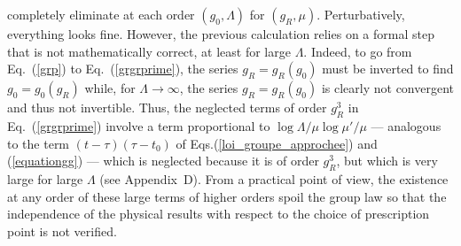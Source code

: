 \documentclass[floatfix,twocolumn,preprintnumbers,amsmath,amssymb,prb]{revtex4}
\begin{document}
completely eliminate at each order $(g_0,\Lambda)$ for $(g_R,\mu)$.
Perturbatively, everything looks fine. However, the previous
calculation relies on a formal step that is not mathematically
correct, at least for large $\Lambda$. Indeed, to go from
Eq.~(\ref{grp}) to Eq.~(\ref{grgrprime}), the series
$g_R=g_R(g_0)$ must be inverted to find $g_0=g_0(g_R)$ while, for
$\Lambda\to\infty$, the series $g_R=g_R(g_0)$ is clearly not 
convergent and thus not invertible. Thus, the neglected terms of
order $g_R^3$ in Eq.~(\ref{grgrprime}) involve a term proportional
to $\log\Lambda/\mu \log\mu'/\mu$ --- analogous to the term
$(t-\tau)(\tau-t_0)$ of Eqs.(\ref{loi_groupe_approchee}) and
(\ref{equationgg}) --- which is neglected because it is of order
$g_R^3$, but which is very large for large $\Lambda$ (see
Appendix~D). From a practical point of view, the existence at any
order of these large terms of higher orders spoil the group law 
so that the independence of the physical results with respect to
the choice of prescription point is not verified. 
\end{document}
